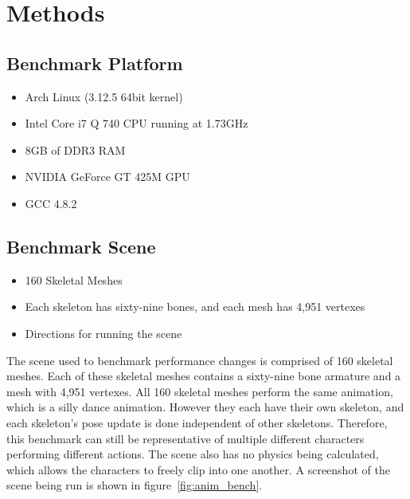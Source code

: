 \section{Methods}

\subsection{Benchmark Platform}
\label{sec:bench_platform}
\ifsummaries
\begin{itemize}
 \item Arch Linux (3.12.5 64bit kernel)
 \item Intel Core i7 Q 740 CPU running at 1.73GHz
 \item 8GB of DDR3 RAM
 \item NVIDIA GeForce GT 425M GPU
 \item GCC 4.8.2
\end{itemize}
\fi


\subsection{Benchmark Scene}
\label{sec:bench_scene}
\ifsummaries
\begin{itemize}
 \item 160 Skeletal Meshes
 \item Each skeleton has sixty-nine bones, and each mesh has 4,951 vertexes
 \item Directions for running the scene
\end{itemize}
\fi

The scene used to benchmark performance changes is comprised of 160 skeletal meshes.
Each of these skeletal meshes contains a sixty-nine bone armature and a mesh with 4,951 vertexes.
All 160 skeletal meshes perform the same animation, which is a silly dance animation.
However they each have their own skeleton, and each skeleton's pose update is done independent of other skeletons.
Therefore, this benchmark can still be representative of multiple different characters performing different actions.
The scene also has no physics being calculated, which allows the characters to freely clip into one another.
A screenshot of the scene being run is shown in figure~\ref{fig:anim_bench}.


